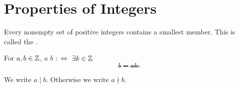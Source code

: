 \section{Properties of Integers}

\begin{mydef}
  Every nonempty set of positive integers contains a smallest member. This is called the .
\end{mydef}

\begin{mydef}
  For $a,b \in \mathbb{Z}$, $a$  $b$ $:\iff$ $\exists k\in \mathbb{Z}$ \st
  \begin{equation}
    b=ak.
  \end{equation}

  We write $a \mid b$. Otherwise we write $a \nmid b$.
\end{mydef}

